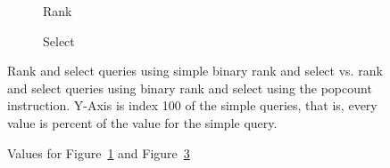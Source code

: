 \begin{figure}\tiny
	\begin{subfigure}{0.48\textwidth}
		
		\caption{Rank}
		\label{fig:rankPopcountDiff}
	\end{subfigure}
	\hfill
	\begin{subfigure}{0.48\textwidth}
		
		\caption{Select}
		\label{fig:selectPopcountDiff}
	\end{subfigure}
	\caption{Rank and select queries using simple binary rank and select vs. rank and select queries using binary rank and select using the popcount instruction. Y-Axis is index 100 of the simple queries, that is, every value is percent of the value for the simple query.}
\end{figure}
\begin{figure}
\center
	\caption{Values for Figure~\ref{fig:rankPopcountDiff} and Figure~\ref{fig:selectPopcountDiff}}
	\label{fig:valuesForPopcountDiff}
	
\end{figure}

\restoregeometry



